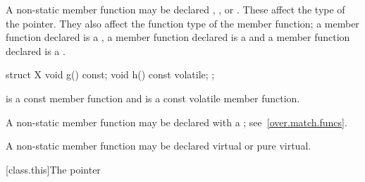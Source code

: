 \pnum
{}%
%
%
A non-static member function may be declared ,
, or  . These
 affect the type of the 
pointer. They also affect the function
type of the member function; a member function declared
 is a , a member function
declared  is a  and a
member function declared   is a
.
\begin{example}

\begin{codeblock}
struct X {
  void g() const;
  void h() const volatile;
};
\end{codeblock}

 is a const member function and  is a
const volatile member function.
\end{example}

\pnum
A non-static member function may be declared with a ; see~\ref{over.match.funcs}.

\pnum
A non-static member function may be declared
virtual or pure virtual.

[class.this]{The  pointer}%

